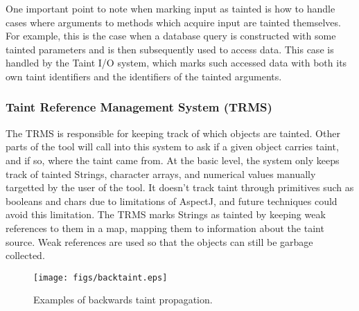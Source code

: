 \documentclass[msc,oneside]{ubcthesis}
\begin{document}
One important point to note when marking input as tainted is how to handle cases where arguments to methods which acquire input are tainted themselves. For example, this is the case when a database query is constructed with some tainted parameters and is then subsequently used to access data. This case is handled by the Taint I/O system, which marks such accessed data with both its own taint identifiers and the identifiers of the tainted arguments.

\subsubsection{Taint Reference Management System (TRMS)} 
The TRMS is responsible for keeping track of which objects are tainted. Other parts of the tool will call into this system to ask if a given object carries taint, and if so, where the taint came from. At the basic level, the system only keeps track of tainted Strings, character arrays, and numerical values manually targetted by the user of the tool. It doesn't track taint through primitives such as booleans and chars due to limitations of AspectJ, and future techniques could avoid this limitation. The TRMS marks Strings as tainted by keeping weak references to them in a map, mapping them to information about the taint source. Weak references are used so that the objects can still be garbage collected.\\

\begin{figure}[ht]
  \begin{center}
    \texttt{[image: figs/backtaint.eps]}
    \caption[Examples of backwards taint propagation.]{\label{fig:backtaint} Examples of backwards taint propagation.}
  \end{center}
\end{figure}
\end{document}
